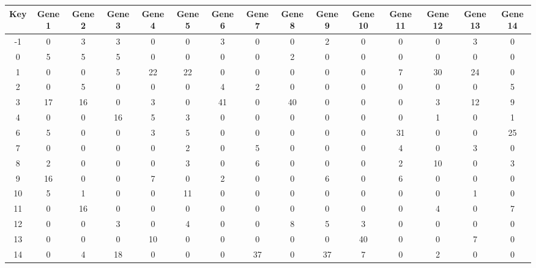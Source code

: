 \begin{tabular}{|c|c|c|c|c|c|c|c|c|c|c|c|c|c|c|}
\hline
Key & Gene 1 & Gene 2 & Gene 3 & Gene 4 & Gene 5 & Gene 6 & Gene 7 & Gene 8 & Gene 9 & Gene 10 & Gene 11 & Gene 12 & Gene 13 & Gene 14 \\
\hline
-1 & 0 & 3 & 3 & 0 & 0 & 3 & 0 & 0 & 2 & 0 & 0 & 0 & 3 & 0 \\
0 & 5 & 5 & 5 & 0 & 0 & 0 & 0 & 2 & 0 & 0 & 0 & 0 & 0 & 0 \\
1 & 0 & 0 & 5 & 22 & 22 & 0 & 0 & 0 & 0 & 0 & 7 & 30 & 24 & 0 \\
2 & 0 & 5 & 0 & 0 & 0 & 4 & 2 & 0 & 0 & 0 & 0 & 0 & 0 & 5 \\
3 & 17 & 16 & 0 & 3 & 0 & 41 & 0 & 40 & 0 & 0 & 0 & 3 & 12 & 9 \\
4 & 0 & 0 & 16 & 5 & 3 & 0 & 0 & 0 & 0 & 0 & 0 & 1 & 0 & 1 \\
6 & 5 & 0 & 0 & 3 & 5 & 0 & 0 & 0 & 0 & 0 & 31 & 0 & 0 & 25 \\
7 & 0 & 0 & 0 & 0 & 2 & 0 & 5 & 0 & 0 & 0 & 4 & 0 & 3 & 0 \\
8 & 2 & 0 & 0 & 0 & 3 & 0 & 6 & 0 & 0 & 0 & 2 & 10 & 0 & 3 \\
9 & 16 & 0 & 0 & 7 & 0 & 2 & 0 & 0 & 6 & 0 & 6 & 0 & 0 & 0 \\
10 & 5 & 1 & 0 & 0 & 11 & 0 & 0 & 0 & 0 & 0 & 0 & 0 & 1 & 0 \\
11 & 0 & 16 & 0 & 0 & 0 & 0 & 0 & 0 & 0 & 0 & 0 & 4 & 0 & 7 \\
12 & 0 & 0 & 3 & 0 & 4 & 0 & 0 & 8 & 5 & 3 & 0 & 0 & 0 & 0 \\
13 & 0 & 0 & 0 & 10 & 0 & 0 & 0 & 0 & 0 & 40 & 0 & 0 & 7 & 0 \\
14 & 0 & 4 & 18 & 0 & 0 & 0 & 37 & 0 & 37 & 7 & 0 & 2 & 0 & 0 \\
\hline
\end{tabular}